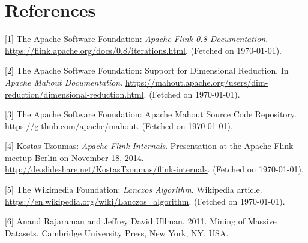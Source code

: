 \section*{References}


\small{
[1] The Apache Software Foundation: {\it Apache Flink 0.8 Documentation}. 
\url{https://flink.apache.org/docs/0.8/iterations.html}. (Fetched on \today).

[2] The Apache Software Foundation: Support for Dimensional Reduction. In
{\it Apache Mahout Documentation}.
\url{https://mahout.apache.org/users/dim-reduction/dimensional-reduction.html}.
(Fetched on \today).

[3] The Apache Software Foundation: Apache Mahout Source Code Repository.
\url{https://github.com/apache/mahout}. (Fetched on \today).

[4] Kostas Tzoumas: {\it Apache Flink Internals}. Presentation at the Apache
Flink meetup Berlin on November 18, 2014.
\url{http://de.slideshare.net/KostasTzoumas/flink-internals}. (Fetched on
\today).

[5] The Wikimedia Foundation: {\it Lanczos Algorithm}. Wikipedia article.
\url{https://en.wikipedia.org/wiki/Lanczos_algorithm}. (Fetched on \today).
}

[6] Anand Rajaraman and Jeffrey David Ullman. 2011. Mining of Massive Datasets. Cambridge University Press, New York, NY, USA.
